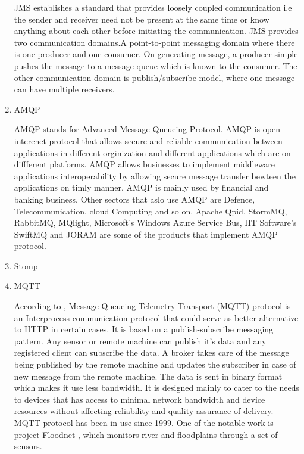 \begin{enumerate}
JMS establishes a standard that provides loosely coupled
communication i.e the sender and receiver need not be present at
the same time or know anything about each other before initiating
the communication.  JMS provides two communication domains.A
point-to-point messaging domain where there is one producer and
one consumer. On generating message, a producer simple pushes the
message to a message queue which is known to the consumer. The
other communication domain is publish/subscribe model, where one
message can have multiple receivers. \label{\detokenize{i524/technologies:id323}}{\hyperref[\detokenize{i524/technologies:www-jms-oracle-docs}]{\sphinxcrossref{{[}274{]}}}}

\item {} 
AMQP

\label{\detokenize{i524/technologies:id324}}{\hyperref[\detokenize{i524/technologies:www-amqp}]{\sphinxcrossref{{[}275{]}}}} AMQP stands for Advanced Message Queueing
Protocol. AMQP is open interenet protocol that allows secure and
reliable communication between applications in different
orginization and different applications which are on diffferent
platforms. AMQP allows businesses to implement middleware
applications interoperability by allowing secure message transfer
bewteen the applications on timly manner. AMQP is mainly used by
financial and banking business. Other sectors that aslo use AMQP
are Defence, Telecommunication, cloud Computing and so on.
Apache Qpid, StormMQ, RabbitMQ, MQlight, Microsoft's Windows
Azure Service Bus, IIT Software's SwiftMQ and JORAM are some of
the products that implement AMQP protocol.

\item {} 
Stomp

\item {} 
MQTT

According to \label{\detokenize{i524/technologies:id325}}{\hyperref[\detokenize{i524/technologies:www-mqtt}]{\sphinxcrossref{{[}276{]}}}}, Message Queueing Telemetry
Transport (MQTT) protocol is an Interprocess communication
protocol that could serve as better alternative to HTTP in
certain cases. It is based on a publish-subscribe messaging
pattern. Any sensor or remote machine can publish it's data and
any registered client can subscribe the data. A broker takes care
of the message being published by the remote machine and updates
the subscriber in case of new message from the remote
machine. The data is sent in binary format which makes it use
less bandwidth. It is designed mainly to cater to the needs to
devices that has access to minimal network bandwidth and device
resources without affecting reliability and quality assurance of
delivery. MQTT protocol has been in use since 1999. One of the
notable work is project Floodnet \label{\detokenize{i524/technologies:id326}}{\hyperref[\detokenize{i524/technologies:www-floodnet}]{\sphinxcrossref{{[}277{]}}}}, which
monitors river and floodplains through a set of sensors.


\end{enumerate}
